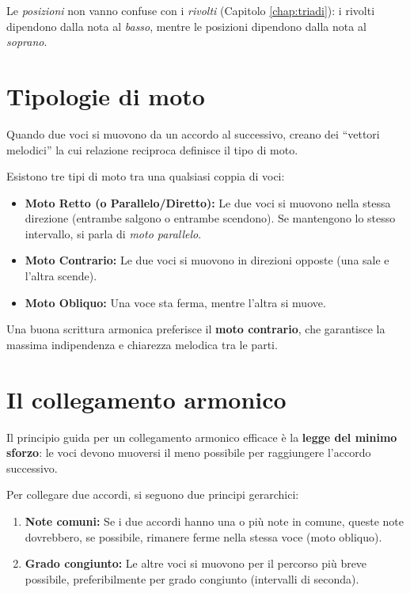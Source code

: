 Le \textit{posizioni} non vanno confuse con i \textit{rivolti} (Capitolo \ref{chap:triadi}): i rivolti dipendono dalla nota al \textit{basso}, mentre le posizioni dipendono dalla nota al \textit{soprano}.

\section{Tipologie di moto}
\label{sec:tipologie_moto}

Quando due voci si muovono da un accordo al successivo, creano dei ``vettori melodici'' la cui relazione reciproca definisce il tipo di moto.

\begin{definizione}
	\label{def:tipi_moto}
	Esistono tre tipi di moto tra una qualsiasi coppia di voci:
	\begin{itemize}
		\item \textbf{Moto Retto (o Parallelo/Diretto):} Le due voci si muovono nella stessa direzione (entrambe salgono o entrambe scendono). Se mantengono lo stesso intervallo, si parla di \textit{moto parallelo}.
		\item \textbf{Moto Contrario:} Le due voci si muovono in direzioni opposte (una sale e l'altra scende).
		\item \textbf{Moto Obliquo:} Una voce sta ferma, mentre l'altra si muove.
	\end{itemize}
\end{definizione}

Una buona scrittura armonica preferisce il \textbf{moto contrario}, che garantisce la massima indipendenza e chiarezza melodica tra le parti.

\section{Il collegamento armonico}
\label{sec:collegamento_armonico}

Il principio guida per un collegamento armonico efficace è la \textbf{legge del minimo sforzo}: le voci devono muoversi il meno possibile per raggiungere l'accordo successivo.

\begin{regola}
	\label{reg:minima_azione}
	Per collegare due accordi, si seguono due principi gerarchici:
	\begin{enumerate}
		\item \textbf{Note comuni:} Se i due accordi hanno una o più note in comune, queste note dovrebbero, se possibile, rimanere ferme nella stessa voce (moto obliquo).
		\item \textbf{Grado congiunto:} Le altre voci si muovono per il percorso più breve possibile, preferibilmente per grado congiunto (intervalli di seconda).
	\end{enumerate}
\end{regola}

